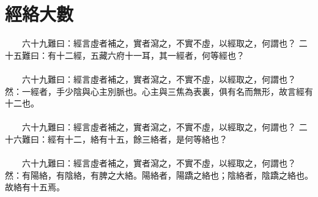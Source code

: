 \section{經絡大數}

　　六十九難曰：經言虛者補之，實者瀉之，不實不虛，以經取之，何謂也？
二十五難曰：有十二經，五藏六府十一耳，其一經者，何等經也？
\\\\
　　六十九難曰：經言虛者補之，實者瀉之，不實不虛，以經取之，何謂也？
然：一經者，手少陰與心主別脈也。心主與三焦為表裏，俱有名而無形，故言經有十二也。
\\\\
　　六十九難曰：經言虛者補之，實者瀉之，不實不虛，以經取之，何謂也？
二十六難曰：經有十二，絡有十五，餘三絡者，是何等絡也？
\\\\
　　六十九難曰：經言虛者補之，實者瀉之，不實不虛，以經取之，何謂也？
然：有陽絡，有陰絡，有脾之大絡。陽絡者，陽蹻之絡也；陰絡者，陰蹻之絡也。故絡有十五焉。
